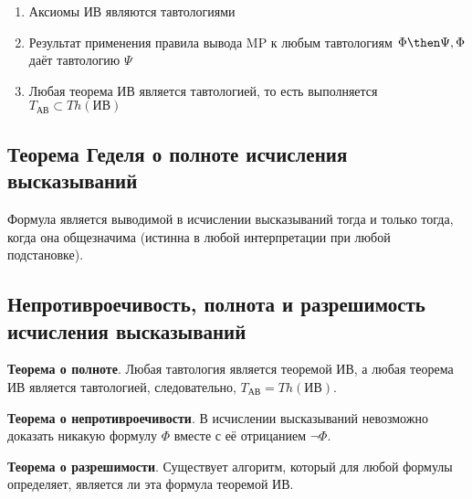 \begin{enumerate}
    \item Аксиомы ИВ являются тавтологиями
    \item Результат применения правила вывода MP к любым тавтологиям $\Phi \then \Psi, \Phi$ даёт тавтологию $\Psi$
    \item Любая теорема ИВ является тавтологией, то есть выполняется $T_{\text{АВ}} \subset Th(\text{ИВ})$
\end{enumerate}

\subsection{Теорема Геделя о полноте исчисления высказываний}
Формула является выводимой в исчислении высказываний тогда и только тогда, когда она общезначима (истинна в любой интерпретации при любой подстановке).

\subsection{Непротивроечивость, полнота и разрешимость исчисления высказываний}
\textbf{Теорема о полноте}. Любая тавтология является теоремой ИВ, а любая теорема ИВ является тавтологией, следовательно, $T_{\text{АВ}} = Th(\text{ИВ})$.

\textbf{Теорема о непротивроечивости}. В исчислении высказываний невозможно доказать никакую формулу $\Phi$ вместе с её отрицанием $\lnot \Phi$.

\textbf{Теорема о разрешимости}. Существует алгоритм, который для любой формулы определяет, является ли эта формула теоремой ИВ.